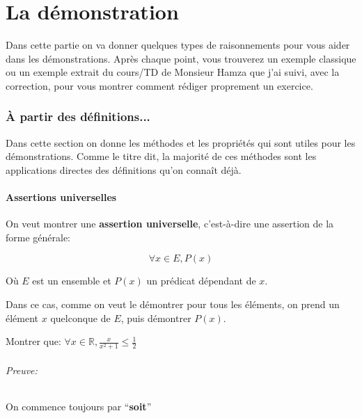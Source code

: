 \documentclass{article}
\begin{document}
\newpage
\part{La démonstration}

Dans cette partie on va donner quelques types de raisonnements pour vous aider dans les démonstrations. Après chaque point, vous trouverez un exemple classique ou un exemple extrait du cours/TD de Monsieur Hamza que j'ai suivi, avec la correction, pour vous montrer comment rédiger proprement un exercice.

\section{À partir des définitions...}

Dans cette section on donne les méthodes et les propriétés qui sont utiles pour les démonstrations. Comme le titre dit, la majorité de ces méthodes sont les applications directes des définitions qu'on connaît déjà.

\subsection{Assertions universelles}

On veut montrer une \textbf{assertion universelle}, c'est-à-dire une assertion de la forme générale:

\[
\forall x \in E, P(x)
\]

Où $E$ est un ensemble et $P(x)$ un prédicat dépendant de $x$.

\begin{tcolorbox}[colback=green!5!white,colframe=green!75!black,title=Point méthode]

Dans ce cas, comme on veut le démontrer pour tous les éléments, on prend un élément $x$ quelconque de $E$, puis démontrer $P(x)$. 

\end{tcolorbox}


\begin{tcolorbox}[colback=cyan!5!white,colframe=cyan!75!black,title=Exercice]

Montrer que: $\forall x \in \mathbb{R}, \frac{x}{x^{2}+1} \leq \frac{1}{2}$

\end{tcolorbox}

\paragraph{Preuve:} On commence toujours par ``\textbf{soit}''
\end{document}
